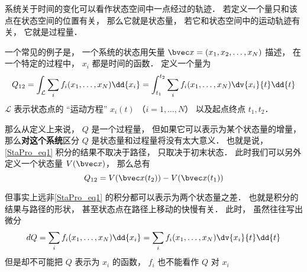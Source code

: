 
\begin{issues}
\issueDraft
\end{issues}

系统关于时间的变化可以看作状态空间中一点经过的轨迹． 若定义一个量只和该点在状态空间的位置有关， 那么它就是状态量， 若它和状态空间中的运动轨迹有关， 它就是过程量．

一个常见的例子是， 一个系统的状态用矢量 $\bvec x = (x_1, x_2, \dots, x_N)$ 描述， 在一个特定的过程中， $x_i$ 都是时间的函数． 定义一个量为
\begin{equation}\label{StaPro_eq1}
Q_{12} = \int_{\mathcal L} \sum_i f_i(x_1, \dots, x_N) \dd{x_i} = \int_{t_1}^{t_2} \sum_i f_i(x_1, \dots, x_N) \dv{x_i}{t} \dd{t}
\end{equation}
$\mathcal L$ 表示状态点的 “运动方程” $x_i(t)$ （$i = 1,\dots, N$） 以及起点终点 $t_1, t_2$．

那么从定义上来说， $Q$ 是一个过程量， 但如果它可以表示为某个状态量的增量， 那么\textbf{对这个系统}区分 $Q$ 是状态量和过程量将没有太大意义． 也就是说， \autoref{StaPro_eq1} 积分的结果不取决于路径， 只取决于初末状态． 此时我们可以另外定义一个状态量 $V(\bvec x)$， 那么总有
\begin{equation}
Q_{12} = V(\bvec x(t_2)) - V(\bvec x(t_1))
\end{equation}

但事实上远非\autoref{StaPro_eq1} 的积分都可以表示为两个状态量之差． 也就是积分的结果与路径的形状， 甚至状态点在路径上移动的快慢有关． 此时， 虽然往往写出微分
\begin{equation}
dQ = \sum_i f_i(x_1, \dots, x_N) \dd{x_i} = \sum_i f_i(x_1, \dots, x_N) \dv{x_i}{t} \dd{t}
\end{equation}
但是却不可能把 $Q$ 表示为 $x_i$ 的函数， $f_i$ 也不能看作 $Q$ 对 $x_i$

